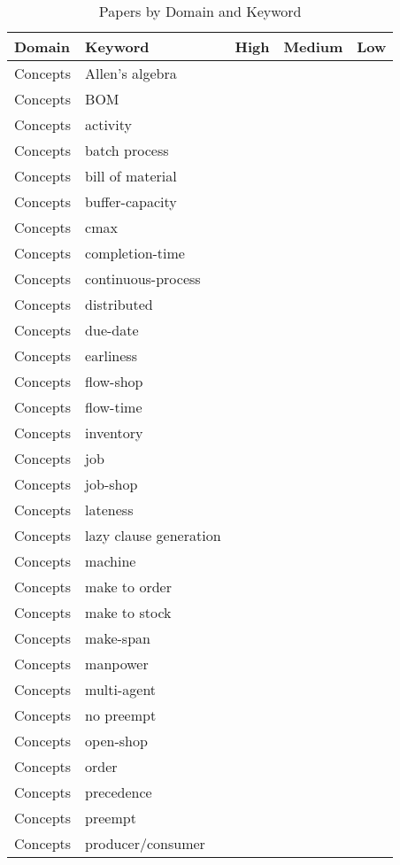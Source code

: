 {\scriptsize
\begin{longtable}{lp{3cm}>{\raggedright}p{6cm}>{\raggedright}p{6cm}p{8cm}}
\caption{Papers by Domain and Keyword}\\ \toprule
Domain & Keyword & High & Medium & Low\\ \midrule\endhead
\bottomrule
\endfoot
Concepts & Allen's algebra &  &  & \\
Concepts & BOM &  &  & \\
Concepts & activity &  &  & \\
Concepts & batch process &  &  & \\
Concepts & bill of material &  &  & \\
Concepts & buffer-capacity &  &  & \\
Concepts & cmax &  &  & \\
Concepts & completion-time &  &  & \\
Concepts & continuous-process &  &  & \\
Concepts & distributed &  &  & \\
Concepts & due-date &  &  & \\
Concepts & earliness &  &  & \\
Concepts & flow-shop &  &  & \\
Concepts & flow-time &  &  & \\
Concepts & inventory &  &  & \\
Concepts & job &  &  & \\
Concepts & job-shop &  &  & \\
Concepts & lateness &  &  & \\
Concepts & lazy clause generation &  &  & \\
Concepts & machine &  &  & \\
Concepts & make to order &  &  & \\
Concepts & make to stock &  &  & \\
Concepts & make-span &  &  & \\
Concepts & manpower &  &  & \\
Concepts & multi-agent &  &  & \\
Concepts & no preempt &  &  & \\
Concepts & open-shop &  &  & \\
Concepts & order &  &  & \\
Concepts & precedence &  &  & \\
Concepts & preempt &  &  & \\
Concepts & producer/consumer &  &  & \\

\end{longtable}}
